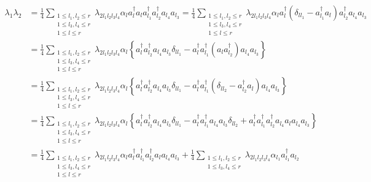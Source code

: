 \documentclass[aps,preprint]{revtex4}%
\begin{document}
\begin{align}
\lambda_{1}\lambda_{2}  &  =\frac{1}{4}\sum_{\substack{1\leq l_{1},l_{2}\leq
r\\1\leq l_{3},l_{4}\leq r\\1\leq l\leq r}}\lambda_{2l_{1}l_{2}l_{3}l_{4}%
}\alpha_{l}a_{l}^{\dagger}a_{l}a_{l_{1}}^{\dagger}a_{l_{2}}^{\dagger}a_{l_{4}%
}a_{l_{3}}=\frac{1}{4}\sum_{\substack{1\leq l_{1},l_{2}\leq r\\1\leq
l_{3},l_{4}\leq r\\1\leq l\leq r}}\lambda_{2l_{1}l_{2}l_{3}l_{4}}\alpha
_{l}a_{l}^{\dagger}\left(  \delta_{ll_{1}}-a_{l_{1}}^{\dagger}a_{l}\right)
a_{l_{2}}^{\dagger}a_{l_{4}}a_{l_{3}}\nonumber\\
&  =\frac{1}{4}\sum_{\substack{1\leq l_{1},l_{2}\leq r\\1\leq l_{3},l_{4}\leq
r\\1\leq l\leq r}}\lambda_{2l_{1}l_{2}l_{3}l_{4}}\alpha_{l}\left\{
a_{l}^{\dagger}a_{l_{2}}^{\dagger}a_{l_{4}}a_{l_{3}}\delta_{ll_{1}}%
-a_{l}^{\dagger}a_{l_{1}}^{\dagger}\left(  a_{l}a_{l_{2}}^{\dagger}\right)
a_{l_{4}}a_{l_{3}}\right\} \nonumber\\
&  =\frac{1}{4}\sum_{\substack{1\leq l_{1},l_{2}\leq r\\1\leq l_{3},l_{4}\leq
r\\1\leq l\leq r}}\lambda_{2l_{1}l_{2}l_{3}l_{4}}\alpha_{l}\left\{
a_{l}^{\dagger}a_{l_{2}}^{\dagger}a_{l_{4}}a_{l_{3}}\delta_{ll_{1}}%
-a_{l}^{\dagger}a_{l_{1}}^{\dagger}\left(  \delta_{ll_{2}}-a_{l_{2}}^{\dagger
}a_{l}\right)  a_{l_{4}}a_{l_{3}}\right\} \nonumber\\
&  =\frac{1}{4}\sum_{\substack{1\leq l_{1},l_{2}\leq r\\1\leq l_{3},l_{4}\leq
r\\1\leq l\leq r}}\lambda_{2l_{1}l_{2}l_{3}l_{4}}\alpha_{l}\left\{
a_{l}^{\dagger}a_{l_{2}}^{\dagger}a_{l_{4}}a_{l_{3}}\delta_{ll_{1}}%
-a_{l}^{\dagger}a_{l_{1}}^{\dagger}a_{l_{4}}a_{l_{3}}\delta_{ll_{2}}%
+a_{l}^{\dagger}a_{l_{1}}^{\dagger}a_{l_{2}}^{\dagger}a_{l_{4}}a_{l}a_{l_{4}%
}a_{l_{3}}\right\} \nonumber\\
&  =\frac{1}{4}\sum_{\substack{1\leq l_{1},l_{2}\leq r\\1\leq l_{3},l_{4}\leq
r\\1\leq l\leq r}}\lambda_{2l_{1}l_{2}l_{3}l_{4}}\alpha_{l}a_{l}^{\dagger
}a_{l_{1}}^{\dagger}a_{l_{2}}^{\dagger}a_{l}a_{l_{4}}a_{l_{3}}+\frac{1}{4}%
\sum_{\substack{1\leq l_{1},l_{2}\leq r\\1\leq l_{3},l_{4}\leq r}%
}\lambda_{2l_{1}l_{2}l_{3}l_{4}}\alpha_{l_{1}}a_{l_{1}}^{\dagger}a_{l_{2}%
}
\end{align}
\end{document}
